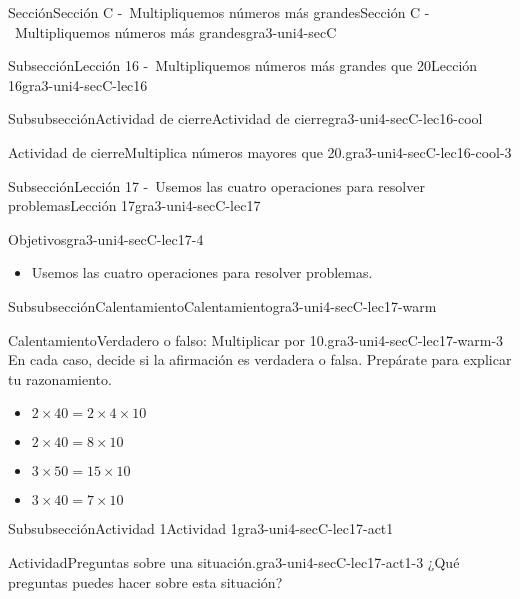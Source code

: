 \documentclass[twoside,14pt,]{extarticle}
\begin{document}
\begin{sectionptx}{Sección}{Sección C -~Multipliquemos números más grandes}{}{Sección C -~Multipliquemos números más grandes}{}{}{gra3-uni4-secC}
\begin{subsectionptx}{Subsección}{Lección 16 -~Multipliquemos números más grandes que 20}{}{Lección 16}{}{}{gra3-uni4-secC-lec16}
\begin{subsubsectionptx}{Subsubsección}{Actividad de cierre}{}{Actividad de cierre}{}{}{gra3-uni4-secC-lec16-cool}
\begin{project}{Actividad de cierre}{Multiplica números mayores que 20.}{gra3-uni4-secC-lec16-cool-3}
\end{project}%
\end{subsubsectionptx}
\end{subsectionptx}
%
%
\typeout{************************************************}
\typeout{************************************************}
%
\begin{subsectionptx}{Subsección}{Lección 17 -~Usemos las cuatro operaciones para resolver problemas}{}{Lección 17}{}{}{gra3-uni4-secC-lec17}
\begin{objectives}{Objetivos}{gra3-uni4-secC-lec17-4}
%
\begin{itemize}[label=\textbullet]
\item{}Usemos las cuatro operaciones para resolver problemas.%
\end{itemize}
\end{objectives}
%
%
\typeout{************************************************}
\typeout{************************************************}
%
\begin{subsubsectionptx}{Subsubsección}{Calentamiento}{}{Calentamiento}{}{}{gra3-uni4-secC-lec17-warm}
\begin{exploration}{Calentamiento}{Verdadero o falso: Multiplicar por 10.}{gra3-uni4-secC-lec17-warm-3}%
En cada caso, decide si la afirmación es verdadera o falsa. Prepárate para explicar tu razonamiento.%
%
\begin{itemize}[label=\textbullet]
\item{}\(\displaystyle 2 \times 40 = 2 \times 4 \times 10\)%
\item{}\(\displaystyle 2 \times 40 = 8 \times 10\)%
\item{}\(\displaystyle 3 \times 50 = 15 \times 10\)%
\item{}\(\displaystyle 3 \times 40 = 7 \times 10\)%
\end{itemize}
\end{exploration}%
\end{subsubsectionptx}
%
%
\typeout{************************************************}
\typeout{************************************************}
%
\begin{subsubsectionptx}{Subsubsección}{Actividad 1}{}{Actividad 1}{}{}{gra3-uni4-secC-lec17-act1}
\begin{activity}{Actividad}{Preguntas sobre una situación.}{gra3-uni4-secC-lec17-act1-3}%
¿Qué preguntas puedes hacer sobre esta situación?%

\end{activity}
\end{subsubsectionptx}
\end{subsectionptx}
\end{sectionptx}
\end{document}
